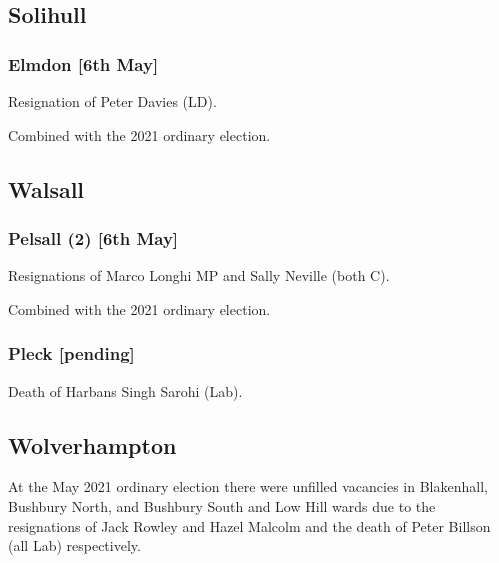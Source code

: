 \documentclass[a4paper,openany]{book}
\begin{document}
\begin{resultsiii}
\subsection*{Solihull}

\subsubsection*{Elmdon \hspace*{\fill}\nolinebreak[1]%
	\enspace\hspace*{\fill}
	[6th May]}


Resignation of Peter Davies (LD).

Combined with the 2021 ordinary election.

\subsection*{Walsall}

\subsubsection*{Pelsall (2) \hspace*{\fill}\nolinebreak[1]%
	\enspace\hspace*{\fill}
	[6th May]}


Resignations of Marco Longhi MP and Sally Neville (both C).

Combined with the 2021 ordinary election.

\subsubsection*{Pleck \hspace*{\fill}\nolinebreak[1]%
	\enspace\hspace*{\fill}
	[pending]}


Death of Harbans Singh Sarohi (Lab).

\subsection*{Wolverhampton}

At the May 2021 ordinary election there were unfilled vacancies in Blakenhall, Bushbury North, and Bushbury South and Low Hill wards due to the resignations of Jack Rowley and Hazel Malcolm and the death of Peter Billson (all Lab) respectively.


\end{resultsiii}
\end{document}
